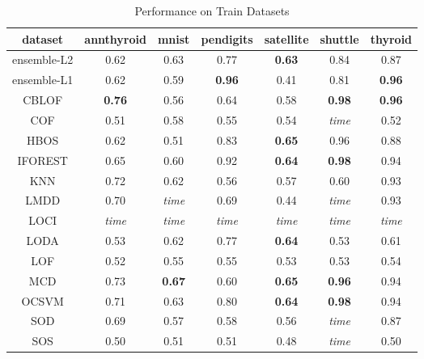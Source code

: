 \begin{table*}[!t]
\renewcommand{\arraystretch}{1.25}
\caption{Performance on Train Datasets}
\label{results:train-performance}
\centering
\begin{tabular}{|c|c|c|c|c|c|c|}
\hline
\textbf{dataset} & \textbf{annthyroid} & \textbf{mnist} & \textbf{pendigits} & \textbf{satellite} & \textbf{shuttle} & \textbf{thyroid} \\
\hline
ensemble-L2 & 0.62 & 0.63 & 0.77 & \bfseries 0.63 & 0.84 & 0.87 \\
\hline
ensemble-L1 & 0.62 & 0.59 & \bfseries 0.96 & 0.41 & 0.81 & \bfseries 0.96 \\
\hline
CBLOF & \bfseries 0.76 & 0.56 & 0.64 & 0.58 & \bfseries 0.98 & \bfseries 0.96 \\
\hline
COF & 0.51 & 0.58 & 0.55 & 0.54 & \textit{time} & 0.52 \\
\hline
HBOS & 0.62 & 0.51 & 0.83 & \bfseries 0.65 & 0.96 & 0.88 \\
\hline
IFOREST & 0.65 & 0.60 & 0.92 & \bfseries 0.64 & \bfseries 0.98 & 0.94 \\
\hline
KNN & 0.72 & 0.62 & 0.56 & 0.57 & 0.60 & 0.93 \\
\hline
LMDD & 0.70 & \textit{time} & 0.69 & 0.44 & \textit{time} & 0.93 \\
\hline
LOCI & \textit{time} & \textit{time} & \textit{time} & \textit{time} & \textit{time} & \textit{time} \\
\hline
LODA & 0.53 & 0.62 & 0.77 & \bfseries 0.64 & 0.53 & 0.61 \\
\hline
LOF & 0.52 & 0.55 & 0.55 & 0.53 & 0.53 & 0.54 \\
\hline
MCD & 0.73 & \bfseries 0.67 & 0.60 & \bfseries 0.65 & \bfseries 0.96 & 0.94 \\
\hline
OCSVM & 0.71 & 0.63 & 0.80 & \bfseries 0.64 & \bfseries 0.98 & 0.94 \\
\hline
SOD & 0.69 & 0.57 & 0.58 & 0.56 & \textit{time} & 0.87 \\
\hline
SOS & 0.50 & 0.51 & 0.51 & 0.48 & \textit{time} & 0.50 \\
\hline
\end{tabular}
\end{table*}


